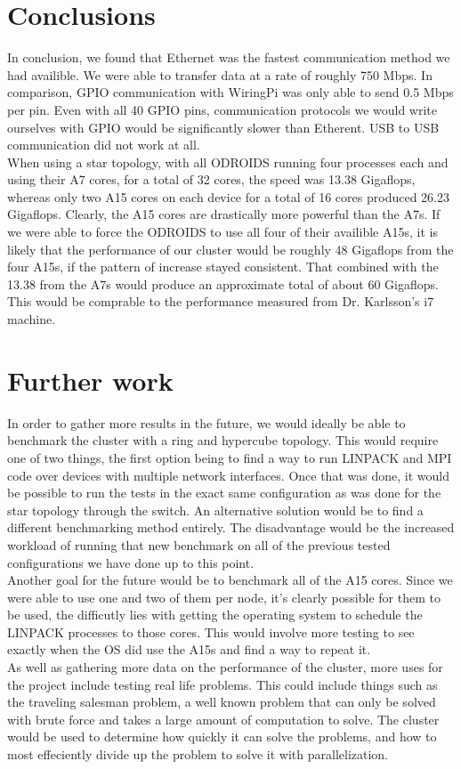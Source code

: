 \section{Conclusions}

In conclusion, we found that Ethernet was the fastest communication method we had availible. We were able to transfer data at a rate of roughly 750 Mbps. In comparison, GPIO communication with WiringPi was only able to send 0.5 Mbps per pin. Even with all 40 GPIO pins, communication protocols we would write ourselves with GPIO would be significantly slower than Etherent. USB to USB communication did not work at all. \\

When using a star topology, with all ODROIDS running four processes each and using their A7 cores, for a total of 32 cores, the speed was 13.38 Gigaflops, whereas only two A15 cores on each device for a total of 16 cores produced 26.23 Gigaflops. Clearly, the A15 cores are drastically more powerful than the A7s. If we were able to force the ODROIDS to use all four of their availible A15s, it is likely that the performance of our cluster would be roughly 48 Gigaflops from the four A15s, if the pattern of increase stayed consistent. That combined with the 13.38 from the A7s would produce an approximate total of about 60 Gigaflops. This would be comprable to the performance measured from Dr. Karlsson's i7 machine.

\section{Further work} 

In order to gather more results in the future, we would ideally be able to benchmark the cluster with a ring and hypercube topology. This would require one of two things, the first option being to find a way to run LINPACK and MPI code over devices with multiple network interfaces. Once that was done, it would be possible to run the tests in the exact same configuration as was done for the star topology through the switch. An alternative solution would be to find a different benchmarking method entirely. The disadvantage would be the increased workload of running that new benchmark on all of the previous tested configurations we have done up to this point. \\

Another goal for the future would be to benchmark all of the A15 cores. Since we were able to use one and two of them per node, it's clearly possible for them to be used, the difficutly lies with getting the operating system to schedule the LINPACK processes to those cores. This would involve more testing to see exactly when the OS did use the A15s and find a way to repeat it. \\

As well as gathering more data on the performance of the cluster, more uses for the project include testing real life problems. This could include things such as the traveling salesman problem, a well known problem that can only be solved with brute force and takes a large amount of computation to solve. The cluster would be used to determine how quickly it can solve the problems, and how to most effeciently divide up the problem to solve it with parallelization.
